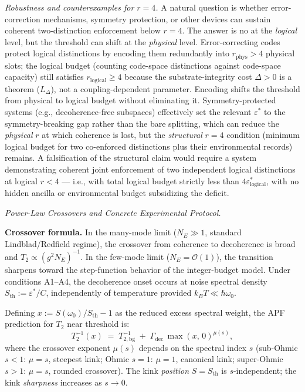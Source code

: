 \documentclass[11pt]{article}
\theoremstyle{remark}
\begin{document}
\smallskip\noindent\textit{Robustness and counterexamples for $r = 4$.}  A natural question is whether error-correction mechanisms, symmetry protection, or other devices can sustain coherent two-distinction enforcement below $r = 4$.  The answer is no at the \emph{logical} level, but the threshold can shift at the \emph{physical} level.  Error-correcting codes protect logical distinctions by encoding them redundantly into $r_{\mathrm{phys}} > 4$ physical slots; the logical budget (counting code-space distinctions against code-space capacity) still satisfies $r_{\mathrm{logical}} \ge 4$ because the substrate-integrity cost $\Delta > 0$ is a theorem ($L_\Delta$), not a coupling-dependent parameter.  Encoding shifts the threshold from physical to logical budget without eliminating it.  Symmetry-protected systems (e.g., decoherence-free subspaces) effectively set the relevant $\varepsilon^*$ to the symmetry-breaking gap rather than the bare splitting, which can reduce the \emph{physical} $r$ at which coherence is lost, but the \emph{structural} $r = 4$ condition (minimum logical budget for two co-enforced distinctions plus their environmental records) remains.  A falsification of the structural claim would require a system demonstrating coherent joint enforcement of two independent logical distinctions at logical $r < 4$ --- i.e., with total logical budget strictly less than $4\varepsilon^*_{\mathrm{logical}}$, with no hidden ancilla or environmental budget subsidizing the deficit.


\medskip\noindent\textit{Power-Law Crossovers and Concrete Experimental Protocol.}
\label{box:experimental_protocol}

\noindent\textbf{Crossover formula.}  In the many-mode limit ($N_E \gg 1$, standard Lindblad/Redfield regime), the crossover from coherence to decoherence is broad and $T_2 \propto (g^2 N_E)^{-1}$.  In the few-mode limit ($N_E = \mathcal{O}(1)$), the transition sharpens toward the step-function behavior of the integer-budget model.  Under conditions A1--A4, the decoherence onset occurs at noise spectral density $S_{\mathrm{th}} := \varepsilon^*/C$, independently of temperature provided $k_B T \ll \hbar\omega_0$.

Defining $x := S(\omega_0)/S_{\mathrm{th}} - 1$ as the reduced excess spectral weight, the APF prediction for $T_2$ near threshold is:
\begin{equation}\label{eq:crossover}
T_2^{-1}(x) \;=\; T_{2,\mathrm{bg}}^{-1} \;+\; \Gamma_{\mathrm{dec}}\, \max(x,\, 0)^{\mu(s)},
\end{equation}
where the crossover exponent $\mu(s)$ depends on the spectral index $s$ (sub-Ohmic $s < 1$: $\mu = s$, steepest kink; Ohmic $s = 1$: $\mu = 1$, canonical kink; super-Ohmic $s > 1$: $\mu = s$, rounded crossover).  The kink \emph{position} $S = S_{\mathrm{th}}$ is $s$-independent; the kink \emph{sharpness} increases as $s \to 0$.
\end{document}
